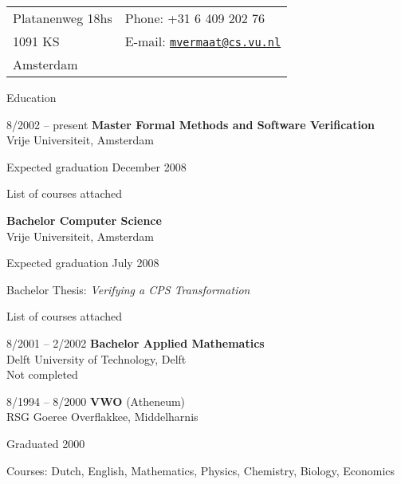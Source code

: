\documentclass[a4paper,11pt]{article}
\newenvironment{sublist}{%
  \begin{list}{}{%
      \setlength{\itemsep}{0em}\setlength{\parsep}{0em}%
      \setlength{\topsep}{0em}\setlength{\parskip}{0em}%
    }%
}%
{ \end{list} }
\begin{document}
\newlength{\oldcvlabelwidth}
\renewcommand*{\cvbibname}{}

\begin{cv}{} %



\hspace{7em}\begin{tabular}{p{12em}l}
  Platanenweg 18hs  & Phone: +31 6 409 202 76\\
  1091 KS           & E-mail: \href{mailto:mvermaat@cs.vu.nl}{\texttt{mvermaat@cs.vu.nl}}\\
  Amsterdam         &
\end{tabular}

\vspace{1em}


\begin{cvlist}{Education}
\item[8/2002 -- present]
  {\bf Master Formal Methods and Software Verification}\\
  Vrije Universiteit, Amsterdam
  \begin{sublist}
  \item Expected graduation December 2008
  \item List of courses attached
  \end{sublist}
  {\bf Bachelor Computer Science}\\
  Vrije Universiteit, Amsterdam
  \begin{sublist}
  \item Expected graduation July 2008
  \item Bachelor Thesis: \textit{Verifying a CPS Transformation}
  \item List of courses attached
  \end{sublist}
\item[8/2001 -- 2/2002]
  {\bf Bachelor Applied Mathematics}\\
  Delft University of Technology, Delft\\
  Not completed
\item[8/1994 -- 8/2000]
  {\bf VWO} (Atheneum)\\
  RSG Goeree Overflakkee,  Middelharnis
  \begin{sublist}
    \item Graduated 2000
    \item Courses: Dutch, English, Mathematics, Physics, Chemistry, Biology, Economics
  \end{sublist}
\end{cvlist}



\end{cv}
\end{document}
